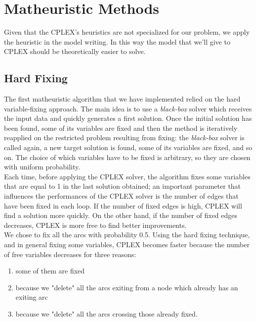 
\chapter{Matheuristic Methods}
\label{chp:4-Matheuristics}
Given that the \textsc{CPLEX}'s heuristics are not specialized for our problem, we apply the heuristic in the model writing. In this way the model that we’ll give to \textsc{CPLEX} should be theoretically easier to solve.

\section{Hard Fixing}
The first matheuristic algorithm that we have implemented relied on the hard variable-fixing approach. The main idea is to use a \textit{black-box} solver which receives the input data and quickly generates a first solution. Once the initial solution has been found, some of its variables are fixed and then the method is iteratively reapplied on the restricted problem resulting from fixing: the \textit{black-box} solver is called again, a new target solution is found, some of its variables are fixed, and so on. The choice of which variables have to be fixed is arbitrary, so they are chosen with uniform probability.\\
Each time, before applying the \textsc{CPLEX} solver, the algorithm fixes some variables that are equal to 1 in the last solution obtained; an important parameter that influences the performances of the \textsc{CPLEX} solver is the number of edges that have been fixed in each loop. If the number of fixed edges is high, \textsc{CPLEX} will find a solution more quickly. On the other hand, if the number of fixed edges decreases, \textsc{CPLEX} is more free to find better improvements. \\
We chose to fix all the arcs with probability 0.5. 
Using the hard fixing technique, and in general fixing some variables, \textsc{CPLEX} becomes faster because the number of free variables decreases for three reasons: 
\begin{enumerate}
\item some of them are fixed
\item because we "delete" all the arcs exiting from a node which already has an exiting arc
\item because we "delete" all the arcs crossing those already fixed.
\end{enumerate}
